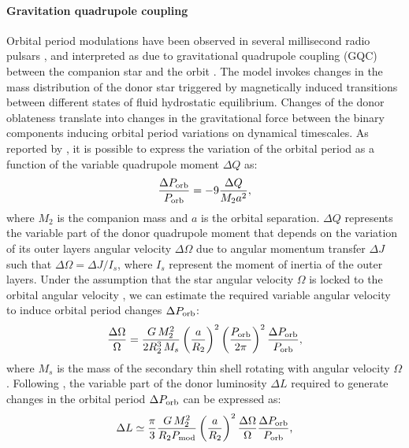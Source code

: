 \documentclass[fleqn,usenatbib]{mnras}
\begin{document}
\paragraph{Gravitation quadrupole coupling} 
\label{sec:gqc}
Orbital period modulations have been observed in several millisecond radio pulsars \citep[e.g., PSR B1957$+$20, PSR J2051$-$0827, and PSR J2339$-$0533;][]{ Applegate:1994vp,Doroshenko2001a,Pletsch2015a}, and interpreted as due to gravitational quadrupole coupling (GQC) between the companion star and the orbit \citep{Applegate:1992uh, Applegate:1994vp}. The model invokes changes in the mass distribution of the donor star triggered by magnetically induced transitions between different states of fluid hydrostatic equilibrium. Changes of the donor oblateness translate into changes in the gravitational force between the binary components inducing orbital period variations on dynamical timescales. As reported by \citet{Applegate:1992uh}, it is possible to express the variation of the orbital period as a function of the variable quadrupole moment $\Delta Q$ as:
\begin{eqnarray}
\frac{\Delta P_{\rm orb}}{P_{\rm orb}}= -9\frac{\Delta Q}{M_2 a^2},
\label{eq:ap1}
\end{eqnarray}
where $M_2$ is the companion mass and $a$ is the orbital separation. 
$\Delta Q$ represents the variable part of the donor quadrupole moment that depends on the variation of its outer layers angular velocity $\Delta \Omega$ due to angular momentum transfer $\Delta J$ such that $\Delta \Omega=\Delta J /I_s$, where $I_s$ represent the moment of inertia of the outer layers. 
Under the assumption that the star angular velocity $\Omega$ is locked to the orbital angular velocity \citep{Applegate:1994vp}, we can estimate the required variable angular velocity to induce orbital period changes $\Delta P_{\rm orb}$:
\begin{eqnarray}
\frac{\Delta \Omega}{\Omega}= \frac{G\,M_2^2}{2R_2^3\,M_s} \left(\frac{a}{R_2}\right)^2\left(\frac{P_{\rm orb}}{2\pi}\right)^2 \frac{\Delta P_{\rm orb}}{P_{\rm orb}},
\label{eq:ap3}
\end{eqnarray}
where $M_s$ is the mass of the secondary thin shell rotating with angular velocity $\Omega$. Following \citet{Applegate:1992uh}, the variable part of the donor luminosity $\Delta L$ required to generate changes in the orbital period $\Delta P_{\rm orb}$ can be expressed as:
\begin{eqnarray}
\Delta L\simeq \frac{\pi}{3} \frac{G\,M_2^2}{R_2 P_{\rm mod}} \left(\frac{a}{R_2}\right)^2 \frac{\Delta \Omega}{\Omega} \frac{\Delta P_{\rm orb}}{P_{\rm orb}},
\label{eq:ap5}
\end{eqnarray}
\end{document}

